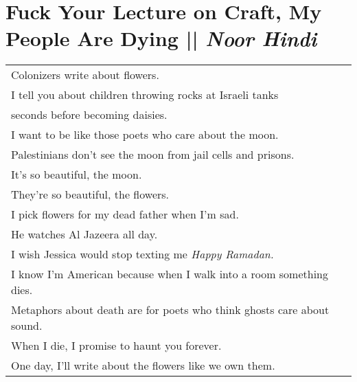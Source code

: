 
\section[Fuck Your Lecture on Craft, My People Are Dying]{Fuck Your Lecture on Craft, My People Are Dying || \emph{Noor Hindi} \hspace*{\fill}  \thepage}
\label{sec:Fuck_Your_Lecture_on_Craft,_My_People_Are_Dying.tex}
\vspace*{2.5cm}
\begin{center}
\begin{tabular}{l}
Colonizers write about flowers.\\
I tell you about children throwing rocks at Israeli tanks\\
seconds before becoming daisies.\\
I want to be like those poets who care about the moon.\\
Palestinians don’t see the moon from jail cells and prisons.\\
It’s so beautiful, the moon.\\
They’re so beautiful, the flowers.\\
I pick flowers for my dead father when I’m sad.\\
He watches Al Jazeera all day.\\
I wish Jessica would stop texting me \emph{Happy Ramadan.}\\
I know I’m American because when I walk into a room something dies.\\
Metaphors about death are for poets who think ghosts care about sound.\\
When I die, I promise to haunt you forever.\\
One day, I’ll write about the flowers like we own them.\\
\end{tabular}
\end{center}
